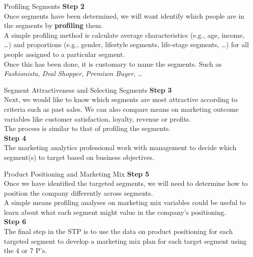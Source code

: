 \documentclass[pdf]{beamer}
\newcommand{\empr}[1]{{\color{franklinblue}\textbf{#1}}}
\theoremstyle{remark}
\theoremstyle{definition}
\begin{document}
\begin{frame}[t]{Profiling Segments}
\textbf{\color{franklinblue} Step 2} \\
\vspace{1.5ex}
Once segments have been determined, we will want identify which people are in the segments by \empr{profiling} them.   \\
\vspace{1.5ex}
A simple profiling method is calculate average characteristics (e.g., age, income, \ldots)  and proportions (e.g., gender, lifestyle segments, life-stage segments, \ldots)  for all people assigned to a particular segment.  \\
\vspace{1.5ex}
Once this has been done, it is customary to name the segments.  Such as \textit{Fashionista}, \textit{Deal Shopper}, \textit{Premium Buyer}, \dots
\end{frame}

\begin{frame}[t]{Segment Attractiveness and Selecting Segments}
\textbf{\color{cardinalred} Step 3} \\
\vspace{1.5ex}
Next, we would like to know which segments are most attractive according to criteria such as past sales. We can also compare means on marketing outcome variables like customer satisfaction, loyalty, revenue or profits. \\
\vspace{1.5ex}
The process is similar to that of profiling the segments.\\
\vspace{1.5ex}
\textbf{\color{cardinalred} Step 4} \\
\vspace{1.5ex}
The marketing analytics professional work with management to decide which segment(s) to target based on business objectives.
\end{frame}

\begin{frame}[t]{Product Positioning and Marketing Mix}
\textbf{\color{calpolypomonagreen} Step 5} \\
\vspace{1.5ex}
Once we have identified the targeted segments, we will need to determine how to position the company differently across segments.  \\
\vspace{1.5ex}
A simple means profiling analyses on marketing mix variables could be useful to learn about what each segment might value in the company's positioning. \\
\vspace{1.5ex}
\textbf{\color{calpolypomonagreen} Step 6} \\
\vspace{1.5ex}
The final step in the STP is to use the data on product positioning for each targeted segment to develop a marketing mix plan for each target segment using the 4 or 7 P's.
\end{frame}
\end{document}
